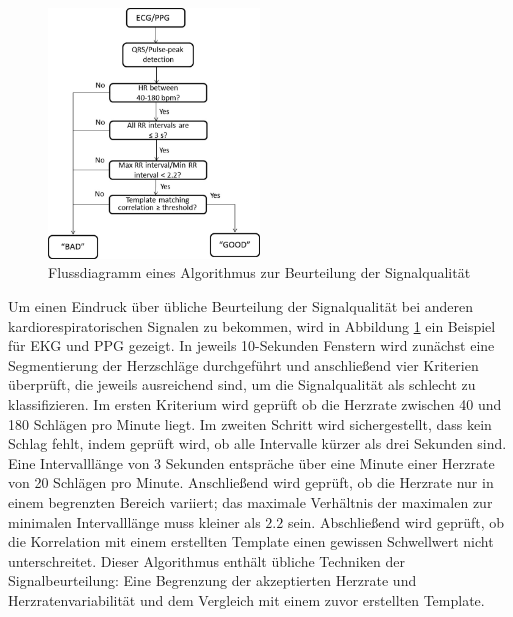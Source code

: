 	\begin{figure}[H]
		\centering
		\includegraphics[width=0.5\textwidth]{pic/ad_flussdiagramm}
		\caption[Flussdiagramm eines Algorithmus zur Beurteilung der Signalqualität]{Flussdiagramm eines Algorithmus zur Beurteilung der Signalqualität\protect\footnotemark}
		\label{fig:ecg-ad}
	\end{figure}
	
	Um einen Eindruck über übliche Beurteilung der Signalqualität bei anderen kardiorespiratorischen Signalen zu bekommen, wird in Abbildung \ref{fig:ecg-ad} ein Beispiel für \ac{EKG} und \ac{PPG} gezeigt. In jeweils 10-Sekunden Fenstern wird zunächst eine Segmentierung der Herzschläge durchgeführt und anschließend vier Kriterien überprüft, die jeweils ausreichend sind, um die Signalqualität als schlecht zu klassifizieren. Im ersten Kriterium wird geprüft ob die Herzrate zwischen 40 und 180 Schlägen pro Minute liegt. Im zweiten Schritt wird sichergestellt, dass kein Schlag fehlt, indem geprüft wird, ob alle Intervalle kürzer als drei Sekunden sind. Eine Intervalllänge von 3 Sekunden entspräche über eine Minute einer Herzrate von 20 Schlägen pro Minute. Anschließend wird geprüft, ob die Herzrate nur in einem begrenzten Bereich variiert; das maximale Verhältnis der maximalen zur minimalen Intervalllänge muss kleiner als $2.2$ sein. Abschließend wird geprüft, ob die Korrelation mit einem erstellten Template einen gewissen Schwellwert nicht unterschreitet. Dieser Algorithmus enthält übliche Techniken der Signalbeurteilung: Eine Begrenzung der akzeptierten Herzrate und Herzratenvariabilität und dem Vergleich mit einem zuvor erstellten Template.
	
